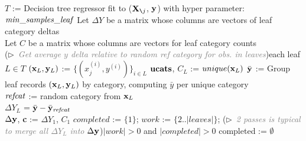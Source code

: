 \documentclass{article}
\newcommand{\cut}[1]{}
\newcommand{\xnj}{${\bf X}_{\texttt{\char`\\}j}$}
\begin{document}
\setlength{\algomargin}{5pt}
\begin{algorithm}[H]
\SetAlgoLined
\DontPrintSemicolon
{}
\SetAlgoSkip{}
\small
\cut{
\KwOut{$\begin{array}[t]{l}
\Delta^{(k)} = \text{category } k \text{'s effect on } y \text{ where } mean(\Delta^{(k)})=0\\
n^{(k)} = \text{number of supported observations per category $k$}\\
\end{array}$
}
}
$T$ := Decision tree regressor fit to (\xnj{}, $\bf y$) with hyper parameter: ${\it min\_samples\_leaf}$\;
Let $\Delta Y$ be a matrix whose columns are vectors of leaf category deltas\\
Let $C$ be a matrix whose columns are vectors for leaf category counts\\
\For(\hfill$\triangleright$\ {\it\textcolor{gray}{\small Get average $y$ delta relative to random ref category for obs. in leaves}}){each leaf $L \in T$}{
        $({\bf x}_L, {\bf y}_L)$ := $\{(x_j^{(i)},  y^{(i)})\}_{i \in L}$
        ${\bf ucats}$, $C_L$ := $unique({\bf x}_L)$
	$\bar{\bf y}$ := Group leaf records $({\bf x}_L, {\bf y}_L)$ by category, computing $\bar{y}$ per unique category\\
	${\it refcat}$ := random category from ${\bf x}_L$\\
	$\Delta {Y}_L$ = $\bar{\bf y} - \bar{\bf y}_{\it refcat}$\\
}
$\Delta {\bf y}$, {\bf c} := $\Delta {Y}_1$, $C_1$
$completed$ := $\{1\}$; $work$ := $\{2 .. |leaves|\}$; 
\While(\hfill$\triangleright$\ {\it\textcolor{gray}{\small 2 passes is typical to merge all $\Delta {Y}_L$ into $\Delta {\bf y}$}}){$|work| > 0$ and $|completed|>0$}{
    completed := $\emptyset$\\
    }
\end{algorithm}
\end{document}

